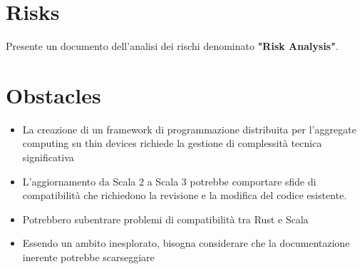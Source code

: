\documentclass[12pt, a4paper]{article}
\begin{document}
\section*{Risks}
Presente un documento dell'analisi dei rischi denominato \textbf{"Risk Analysis"}.

\section*{Obstacles}
\begin{itemize}
    \item La creazione di un framework di programmazione distribuita per l'aggregate computing su
          thin devices richiede la gestione di complessità tecnica significativa
    \item L'aggiornamento da Scala 2 a Scala 3 potrebbe comportare sfide di compatibilità che richiedono
          la revisione e la modifica del codice esistente.
    \item Potrebbero subentrare problemi di compatibilità tra Rust e Scala
    \item Essendo un ambito inesplorato, bisogna considerare che la documentazione inerente potrebbe scarseggiare

\end{itemize}
\end{document}
